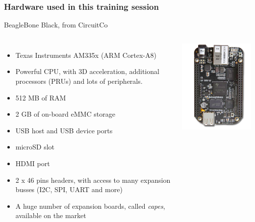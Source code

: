 \begin{frame}
\frametitle{Hardware used in this training session}
  BeagleBone Black, from CircuitCo
  \begin{columns}
    \footnotesize
    \begin{itemize}
      \item Texas Instruments AM335x (ARM Cortex-A8)
      \item Powerful CPU, with 3D acceleration, additional processors
        (PRUs) and lots of peripherals.
      \item 512 MB of RAM
      \item 2 GB of on-board eMMC storage
      \item USB host and USB device ports
      \item microSD slot
      \item HDMI port
      \item 2 x 46 pins headers, with access to many expansion busses
        (I2C, SPI, UART and more)
      \item A huge number of expansion boards, called {\em capes},
        available on the market
    \end{itemize}
    \includegraphics[width=\textwidth]{slides/beagleboneblack-board/beagleboneblack.png}
  \end{columns}
\end{frame}
